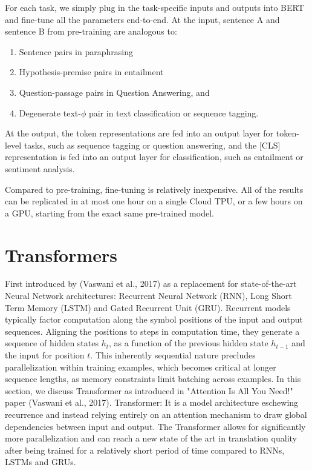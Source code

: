 \documentclass{report}
\begin{document}
For each task, we simply plug  in the task-specific inputs and outputs into BERT and fine-tune all the parameters end-to-end. At the input, sentence A and sentence B from pre-training are analogous to:
\begin{enumerate}
	\item Sentence pairs in paraphrasing
	\item Hypothesis-premise pairs in entailment
	\item Question-passage pairs in Question Answering, and
	\item Degenerate text-$\phi$ pair in text classification or sequence tagging.
\end{enumerate}
At the output, the token representations are fed into an output layer for token-level tasks, such as sequence tagging or question answering, and the [CLS] representation is fed into an output layer for classification, such as entailment or sentiment analysis.

Compared to pre-training, fine-tuning is relatively inexpensive. All of the results can be replicated in at most one hour on a single Cloud TPU, or a few hours on a GPU, starting from the exact same pre-trained model. 

\section{Transformers}
\label{sec:transformers}
First introduced by (Vaswani et al., 2017) as a replacement for state-of-the-art Neural Network architectures: Recurrent Neural Network (RNN), Long Short Term Memory (LSTM) and Gated Recurrent Unit (GRU). Recurrent models typically factor computation along the symbol positions of the input and output sequences. Aligning the positions to steps in computation time, they generate a sequence of hidden states $h_t$, as a function of the previous hidden state $h_{t-1}$ and the input for position $t$. This inherently sequential nature precludes parallelization within training examples, which becomes critical at longer sequence lengths, as memory constraints limit batching across examples. 
In this section, we discuss Transformer as introduced in "Attention Is All You Need!" paper (Vaswani et al., 2017). 
Transformer: It is a model architecture eschewing recurrence and instead relying entirely on an attention mechanism to draw global dependencies between input and output. The Transformer allows for significantly more parallelization and can reach a new state of the art in translation quality after being trained for a relatively short period of time compared to RNNs, LSTMs and GRUs.
\end{document}
